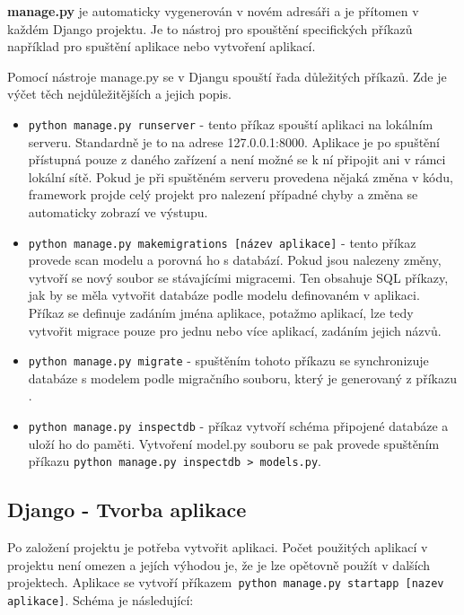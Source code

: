 \textbf{manage.py} je automaticky vygenerován v novém adresáři a je
přítomen v každém Django projektu. Je to nástroj pro spouštění
specifických příkazů například pro spuštění aplikace nebo vytvoření
aplikací.

\newpage

Pomocí nástroje manage.py se v Djangu spouští řada důležitých
příkazů. Zde je výčet těch nejdůležitějších a jejich popis.

\begin{itemize}
\item {\tt python manage.py runserver} - tento příkaz spouští
  aplikaci na lokálním serveru. Standardně je to na adrese
  127.0.0.1:8000. Aplikace je po spuštění přístupná pouze z daného
  zařízení a není možné se k ní připojit ani v rámci lokální
  sítě. Pokud je při spuštěném serveru provedena nějaká změna v kódu,
  framework projde celý projekt pro nalezení případné chyby a změna se
  automaticky zobrazí ve výstupu.
	
\item {\tt python manage.py makemigrations [název aplikace]} -
  tento příkaz provede scan modelu a porovná ho s databází. Pokud jsou
  nalezeny změny, vytvoří se nový soubor se stávajícími migracemi. Ten
  obsahuje SQL příkazy, jak by se měla vytvořit databáze podle modelu
  definovaném v aplikaci. Příkaz se definuje zadáním jména aplikace,
  potažmo aplikací, lze tedy vytvořit migrace pouze pro jednu nebo
  více aplikací, zadáním jejich názvů.

\item {\tt python manage.py migrate} - spuštěním tohoto příkazu se
  synchronizuje databáze s modelem podle migračního souboru, který je
  generovaný z příkazu .
	
\item {\tt python manage.py inspectdb} - příkaz vytvoří schéma
  připojené databáze a uloží ho do paměti. Vytvoření model.py souboru
  se pak provede spuštěním příkazu {\tt python manage.py inspectdb
    > models.py}.

\end{itemize}

\newpage

\subsection{Django - Tvorba aplikace}

Po založení projektu je potřeba vytvořit aplikaci. Počet použitých
aplikací v projektu není omezen a jejích výhodou je, že je lze
opětovně použít v dalších projektech. Aplikace se vytvoří příkazem{\tt
python manage.py startapp [nazev aplikace]}. Schéma je následující:

